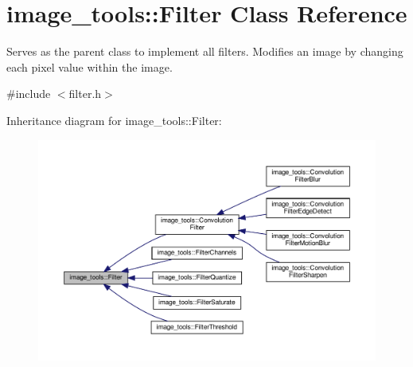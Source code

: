 \hypertarget{classimage__tools_1_1Filter}{}\section{image\+\_\+tools\+:\+:Filter Class Reference}
\label{classimage__tools_1_1Filter}


Serves as the parent class to implement all filters. Modifies an image by changing each pixel value within the image.  




{\ttfamily \#include $<$filter.\+h$>$}



Inheritance diagram for image\+\_\+tools\+:\+:Filter\+:
\nopagebreak
\begin{figure}[H]
\begin{center}
\leavevmode
\includegraphics[width=350pt]{classimage__tools_1_1Filter__inherit__graph}
\end{center}
\end{figure}
